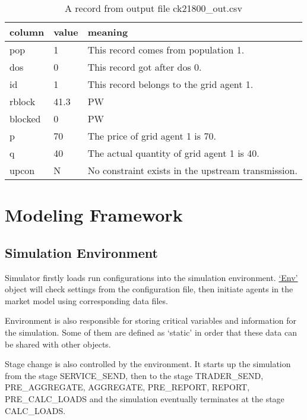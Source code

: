 \documentclass[12pt]{article}
\begin{document}
\begin{table}[H]
    \caption{A record from output file ck21800\_out.csv}
    \begin{center}
        \begin{tabular} {| l | l | l |}
            \hline
            \textbf{column} & \textbf{value} & \textbf{meaning} \\ \hline
            pop & 1 & This record comes from population 1. \\ \hline
            dos & 0 & This record got after dos 0. \\ \hline
            id & 1 & This record belongs to the grid agent 1. \\ \hline
            rblock & 41.3 & PW \\ \hline
            blocked & 0 & PW \\ \hline
            p & 70 & The price of grid agent 1 is 70. \\ \hline
            q & 40 & The actual quantity of grid agent 1 is 40. \\ \hline
            upcon & N & No constraint exists in the upstream transmission. \\ \hline
        \end{tabular}
    \end{center}
\end{table}

\section{Modeling Framework}
\label{sec:modeling}

\subsection{Simulation Environment} \mbox{}

Simulator firstly loads run configurations into the simulation environment. 
\hyperref[subsec:objects_env]{`Env'} object will check settings from the configuration file, 
then initiate agents in the market model using corresponding data files. 

Environment is also responsible for storing critical variables and information for the simulation. 
Some of them are defined as `static' in order that these data can be shared with other objects. 

Stage change is also controlled by the environment. 
It starts up the simulation from the stage SERVICE\_SEND, then to the stage TRADER\_SEND, PRE\_AGGREGATE, 
AGGREGATE, PRE\_REPORT, REPORT, PRE\_CALC\_LOADS and the simulation eventually terminates at the stage CALC\_LOADS. 
\end{document}
